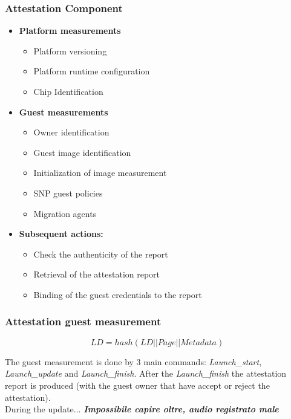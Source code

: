 \subsubsection{Attestation Component}

\begin{multicols}{2}
    \begin{itemize}[itemsep=0pt]
        \item \textbf{Platform measurements}
        \begin{itemize}[itemsep=0pt]
            \item Platform versioning
            \item Platform runtime configuration
            \item Chip Identification
        \end{itemize}
        \item \textbf{Guest measurements}
        \begin{itemize}[itemsep=0pt]
            \item Owner identification
            \item Guest image identification
            \item Initialization of image measurement
            \item SNP guest policies
            \item Migration agents
        \end{itemize}
        \item \textbf{Subsequent actions:}
        \begin{itemize}[itemsep=0pt]
            \item Check the authenticity of the report
            \item Retrieval of the attestation report
            \item Binding of the guest credentials to the report
        \end{itemize}
    \end{itemize}
\end{multicols}

\subsubsection{Attestation guest measurement}

$$LD = hash( LD || Page || Metadata)$$

The guest measurement is done by 3 main commands: \textit{Launch\_start}, \textit{Launch\_update} and \textit{Launch\_finish}. After the \textit{Launch\_finish} the attestation report is produced 
(with the guest owner that have accept or reject the attestation). \\
During the update... \textbf{\textit{Impossibile capire oltre, audio registrato male}} \bigskip

